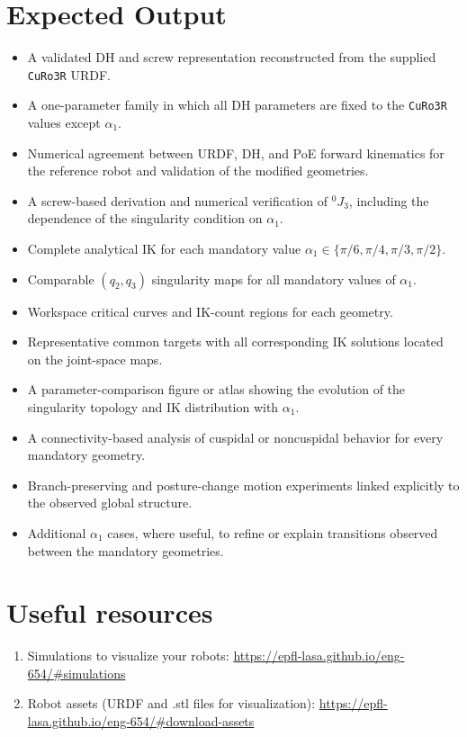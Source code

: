 \documentclass[11pt,a4paper]{article}
\begin{document}
\section*{Expected Output}
\begin{itemize}
  \item A validated DH and screw representation reconstructed from the supplied \texttt{CuRo3R} URDF.
  \item A one-parameter family in which all DH parameters are fixed to the \texttt{CuRo3R} values except $\alpha_1$.
  \item Numerical agreement between URDF, DH, and PoE forward kinematics for the reference robot and validation of the modified geometries.
  \item A screw-based derivation and numerical verification of $^{0}J_3$, including the dependence of the singularity condition on $\alpha_1$.
  \item Complete analytical IK for each mandatory value $\alpha_1\in\{\pi/6,\pi/4,\pi/3,\pi/2\}$.
  \item Comparable $(q_2,q_3)$ singularity maps for all mandatory values of $\alpha_1$.
  \item Workspace critical curves and IK-count regions for each geometry.
  \item Representative common targets with all corresponding IK solutions located on the joint-space maps.
  \item A parameter-comparison figure or atlas showing the evolution of the singularity topology and IK distribution with $\alpha_1$.
  \item A connectivity-based analysis of cuspidal or noncuspidal behavior for every mandatory geometry.
  \item Branch-preserving and posture-change motion experiments linked explicitly to the observed global structure.
  \item Additional $\alpha_1$ cases, where useful, to refine or explain transitions observed between the mandatory geometries.
\end{itemize}

\section*{Useful resources}
\begin{enumerate}
	\item Simulations to visualize your robots: \url{https://epfl-lasa.github.io/eng-654/#simulations} 
	\item Robot assets (URDF and .stl files for visualization): \url{https://epfl-lasa.github.io/eng-654/#download-assets}
\end{enumerate}
\end{document}

